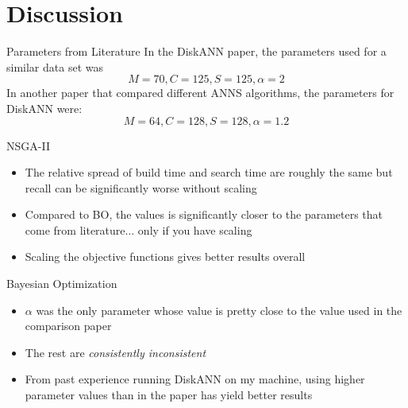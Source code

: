 \section{Discussion}

\frame{\insertsection}

\begin{frame}{Parameters from Literature}
    In the DiskANN paper, the parameters used for a similar data set was
    \[
        M=70, C=125, S=125, \alpha=2
    \]
    In another paper that compared different ANNS algorithms, the parameters for DiskANN were:
    \[
        M=64, C=128, S=128, \alpha=1.2
    \]
\end{frame}

\begin{frame}{NSGA-II}
    \begin{itemize}
        \item The relative spread of build time and search time are roughly the same but recall can be significantly worse without scaling
        \item Compared to BO, the values is significantly closer to the parameters that come from literature... only if you have scaling
        \item Scaling the objective functions gives better results overall
    \end{itemize}
\end{frame}

\begin{frame}{Bayesian Optimization}
    \begin{itemize}
        \item \(\alpha\) was the only parameter whose value is pretty close to the value used in the comparison paper
        \item The rest are \textit{consistently inconsistent}
        \item From past experience running DiskANN on my machine, using higher parameter values than in the paper has yield better results
    \end{itemize}
\end{frame}
